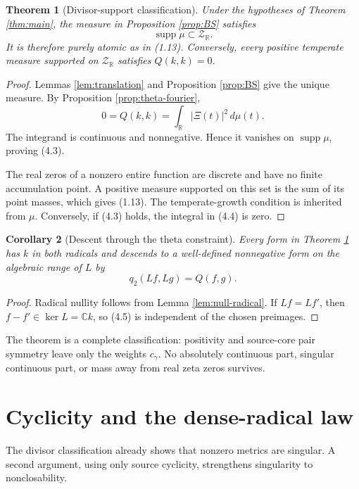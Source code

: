 \documentclass[11pt]{article}
\newtheorem{theorem}{Theorem}[section]
\newtheorem{corollary}[theorem]{Corollary}
\newcommand{\C}{\mathbb C}
\newcommand{\R}{\mathbb R}
\newcommand{\cZ}{\mathcal Z}
\newcommand{\supp}{\operatorname{supp}}
\begin{document}
\begin{theorem}[Divisor-support classification]\label{thm:divisor}
Under the hypotheses of Theorem \ref{thm:main}, the measure in
Proposition \ref{prop:BS} satisfies
\[
 \supp\mu\subset\cZ_{\R}.
\tag{4.3}
\]
It is therefore purely atomic as in (1.13).  Conversely, every positive temperate measure
supported on \(\cZ_{\R}\) satisfies \(Q(k,k)=0\).
\end{theorem}

\begin{proof}
Lemmas \ref{lem:translation} and Proposition \ref{prop:BS} give the unique measure.  By
Proposition \ref{prop:theta-fourier},
\[
 0=Q(k,k)=\int_{\R}|\Xi(t)|^2\,d\mu(t).
\tag{4.4}
\]
The integrand is continuous and nonnegative.  Hence it vanishes on \(\supp\mu\), proving
(4.3).

The real zeros of a nonzero entire function are discrete and have no finite accumulation point.
A positive measure supported on this set is the sum of its point masses, which gives (1.13).
The temperate-growth condition is inherited from \(\mu\).  Conversely, if (4.3) holds, the
integral in (4.4) is zero.
\end{proof}

\begin{corollary}[Descent through the theta constraint]\label{cor:descent}
Every form in Theorem \ref{thm:divisor} has \(k\) in both radicals and descends to a
well-defined nonnegative form on the algebraic range of \(L\) by
\[
 q_2(Lf,Lg)=Q(f,g).
\tag{4.5}
\]
\end{corollary}

\begin{proof}
Radical nullity follows from Lemma \ref{lem:null-radical}.  If \(Lf=Lf'\), then
\(f-f'\in\ker L=\C k\), so (4.5) is independent of the chosen preimages.
\end{proof}

The theorem is a complete classification: positivity and source-core pair symmetry leave only
the weights \(c_\gamma\).  No absolutely continuous part, singular continuous part, or mass away
from real zeta zeros survives.

\section{Cyclicity and the dense-radical law}\label{sec:cyclicity}

The divisor classification already shows that nonzero metrics are singular.  A second argument,
using only source cyclicity, strengthens singularity to nonclosability.
\end{document}
